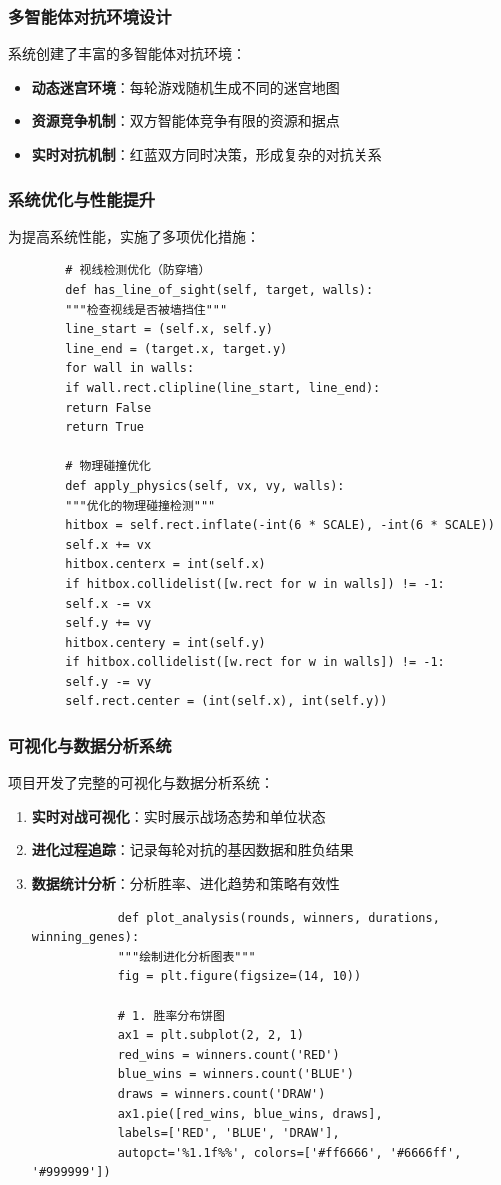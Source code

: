 \documentclass[12pt,a4paper]{article}
\begin{document}
	\subsubsection{多智能体对抗环境设计}
	系统创建了丰富的多智能体对抗环境：
	\begin{itemize}
		\item \textbf{动态迷宫环境}：每轮游戏随机生成不同的迷宫地图
		\item \textbf{资源竞争机制}：双方智能体竞争有限的资源和据点
		\item \textbf{实时对抗机制}：红蓝双方同时决策，形成复杂的对抗关系
	\end{itemize}
	
	\subsubsection{系统优化与性能提升}
	为提高系统性能，实施了多项优化措施：
	
	\begin{verbatim}
		# 视线检测优化（防穿墙）
		def has_line_of_sight(self, target, walls):
		"""检查视线是否被墙挡住"""
		line_start = (self.x, self.y)
		line_end = (target.x, target.y)
		for wall in walls:
		if wall.rect.clipline(line_start, line_end):
		return False
		return True
		
		# 物理碰撞优化
		def apply_physics(self, vx, vy, walls):
		"""优化的物理碰撞检测"""
		hitbox = self.rect.inflate(-int(6 * SCALE), -int(6 * SCALE))
		self.x += vx
		hitbox.centerx = int(self.x)
		if hitbox.collidelist([w.rect for w in walls]) != -1:
		self.x -= vx
		self.y += vy
		hitbox.centery = int(self.y)
		if hitbox.collidelist([w.rect for w in walls]) != -1:
		self.y -= vy
		self.rect.center = (int(self.x), int(self.y))
	\end{verbatim}
	
	\subsubsection{可视化与数据分析系统}
	项目开发了完整的可视化与数据分析系统：
	\begin{enumerate}
		\item \textbf{实时对战可视化}：实时展示战场态势和单位状态
		\item \textbf{进化过程追踪}：记录每轮对抗的基因数据和胜负结果
		\item \textbf{数据统计分析}：分析胜率、进化趋势和策略有效性
		
		\begin{verbatim}
			def plot_analysis(rounds, winners, durations, winning_genes):
			"""绘制进化分析图表"""
			fig = plt.figure(figsize=(14, 10))
			
			# 1. 胜率分布饼图
			ax1 = plt.subplot(2, 2, 1)
			red_wins = winners.count('RED')
			blue_wins = winners.count('BLUE')
			draws = winners.count('DRAW')
			ax1.pie([red_wins, blue_wins, draws], 
			labels=['RED', 'BLUE', 'DRAW'],
			autopct='%1.1f%%', colors=['#ff6666', '#6666ff', '#999999'])
		\end{verbatim}
	\end{enumerate}
	
\end{document}
